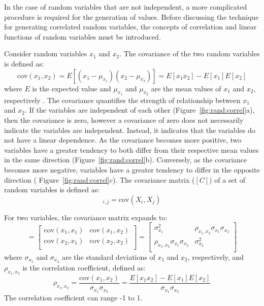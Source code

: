 \documentclass[12pt,oneside]{book}
\begin{document}

In the case of random variables that are not independent, a more complicated procedure is required
for the generation of values. Before discussing the technique for generating correlated random
variables, the concepts of correlation and linear functions of random variables must be introduced. 

Consider random variables $x_1$ and $x_2$.  The covariance of the two random variables is defined as:
\begin{equation}
    \textrm{cov}(x_1, x_2) = E[(x_1 - \mu_{x_1})(x_2 - \mu_{x_2})] = E[x_1 x_2] - E[x_1] E[x_2]
\end{equation}
where $E$ is the expected value and $\mu_{x_1}$ and $\mu_{x_2}$ are the mean values of $x_1$ and
$x_2$, respectively \citep{ang:vol1}.  The covariance quantifies the strength of relationship between
$x_1$ and $x_2$. If the variables are independent of each other (Figure~\ref{fig:rand:correl}a),
then the covariance is zero, however a covariance of zero does not necessarily indicate the
variables are independent. Instead, it indicates that the variables do not have a linear dependence.
As the covariance becomes more positive, two variables have a greater tendency to both differ from
their respective mean values in the same direction (Figure~\ref{fig:rand:correl}b).  Conversely, as
the covariance becomes more negative, variables have a greater tendency to differ in the opposite
direction ( Figure~\ref{fig:rand:correl}c).  The covariance matrix ($[C]$) of a set of random
variables is defined as:
\begin{equation}
    [C]_{i,j}  = \mathrm{cov}(X_i,X_j)
    \label{eq:covMatrix}
\end{equation}

For two variables, the covariance matrix expands to:
\begin{equation}
    [C] = 
    \left[
        \begin{array}{cc}
            \textrm{cov}(x_1, x_1) & \textrm{cov}(x_1, x_2 ) \\
            \textrm{cov}(x_2, x_1) & \textrm{cov}(x_2, x_2 ) \\
        \end{array}
    \right]
    = 
    \left[
        \begin{array}{cc}
            \sigma_{x_1} ^ 2 & \rho_{x_1, x_2} \sigma_{x_1} \sigma_{x_2} \\
            \rho_{x_1, x_2} \sigma_{x_1} \sigma_{x_2} & \sigma_{x_2} ^ 2 \\
        \end{array}
    \right]
\end{equation}
where $\sigma_{x_1}$ and $\sigma_{x_2}$ are the standard deviations of $x_1$ and $x_2$,
respectively, and $\rho_{x_1, x_2}$ is the correlation coefficient, defined as:
\begin{equation}
    \rho_{x_1,x_2} = \frac{\mathrm{cov}(x_1,x_2)}{\sigma_{x_1} \sigma_{x_2}} = 
    \frac{E[x_1 x_2] - E[x_1] E[x_2]}{\sigma_{x_1} \sigma_{x_2}}
    \label{eq:correlCoeff}
\end{equation}
The correlation coefficient can range -1 to 1.
\end{document}
